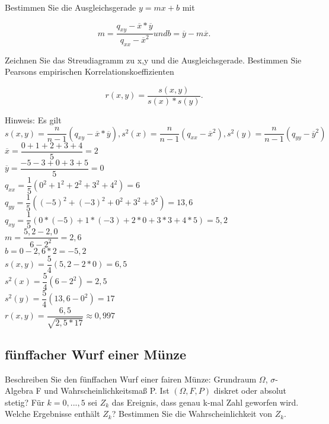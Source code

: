 \documentclass[paper=a4, fontsize=11pt]{scrartcl}
\numberwithin{equation}{section}
\numberwithin{figure}{section}
\numberwithin{table}{section}
\begin{document}
Bestimmen Sie die Ausgleichsgerade  $y=mx+b$ mit

$$m=\dfrac{q_{xy}-\overline{x}* \overline{y}}{q_{xx}- \overline{x}^{2}} und b= \overline{y} - m \overline{x}.$$

Zeichnen Sie das Streudiagramm zu x,y und die Ausgleichsgerade. Bestimmen Sie Pearsons empirischen Korrelationskoeffizienten

$$r(x,y)= \dfrac{s(x,y)}{s(x)*s(y)}.$$

Hinweis: Es gilt $s(x,y)=\dfrac{n}{n-1}(q_{xy}-\overline{x}* \overline{y}), s^{2}(x)=\dfrac{n}{n-1}(q_{xx}-\overline{x}^{2}), s^{2}(y)=\dfrac{n}{n-1}(q_{yy}-\overline{y}^{2})$ \\

$\overline{x}= \dfrac{0+1+2+3+4}{5} = 2$ \\
$\overline{y}= \dfrac{-5-3+0+3+5}{5} = 0$ \\

$q_{xx} = \dfrac{1}{5} (0^{2}+1^{2}+2^{2}+3^{2}+4^{2}) = 6$ \\
$q_{yy} = \dfrac{1}{5} ((-5)^{2}+(-3)^{2}+0^{2}+3^{2}+5^{2}) = 13,6$ \\
$q_{xy} = \dfrac{1}{5} (0*(-5)+1*(-3)+2*0+3*3+4*5)= 5,2$ \\

$m= \dfrac{5,2-2,0}{6-2^{2}} = 2,6$ \\
$b= 0-2,6*2= -5,2$ \\

$s(x,y)= \dfrac{5}{4} (5,2-2*0) =6,5$ \\
$s^{2}(x) = \dfrac{5}{4} (6-2^{2}) = 2,5$ \\
$s^{2}(y) = \dfrac{5}{4} (13,6-0^{2}) = 17$ \\

$r(x,y)= \dfrac{6,5}{\sqrt{2,5 * 17}} \approx 0,997$

\subsection{fünffacher Wurf einer Münze}
Beschreiben Sie den fünffachen Wurf einer fairen Münze: Grundraum $\Omega$, $\sigma$-Algebra F und Wahrscheinlichkeitsmaß P. Ist $(\Omega, F, P)$ diskret oder absolut stetig? Für $k=0,...,5$ sei $Z_{k}$ das Ereignis, dass genau k-mal Zahl geworfen wird. Welche Ergebnisse enthält $Z_{k}$? Bestimmen Sie die Wahrscheinlichkeit von $Z_{k}$. \\

\end{document}
